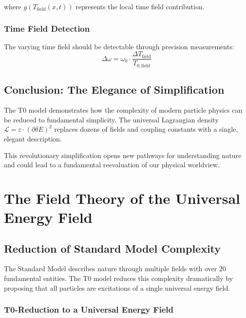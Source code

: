 \documentclass[12pt,a4paper]{report}
\begin{document}
	where $g(T_{\text{field}}(x,t))$ represents the local time field contribution.
	
	\subsection{Time Field Detection}
	
	The varying time field should be detectable through precision measurements:
	\begin{equation}
		\Delta\omega = \omega_0 \cdot \frac{\Delta T_{\text{field}}}{T_{0,\text{field}}}
	\end{equation}
	
	\section{Conclusion: The Elegance of Simplification}
	
	The T0 model demonstrates how the complexity of modern particle physics can be reduced to fundamental simplicity. The universal Lagrangian density $\mathcal{L} = \varepsilon \cdot (\partial\delta E)^2$ replaces dozens of fields and coupling constants with a single, elegant description.
	
	This revolutionary simplification opens new pathways for understanding nature and could lead to a fundamental reevaluation of our physical worldview.
	
	\chapter{The Field Theory of the Universal Energy Field}
	\label{chap:universal_field_theory}
	
	\section{Reduction of Standard Model Complexity}
	\label{sec:sm_complexity}
	
	The Standard Model describes nature through multiple fields with over 20 fundamental entities. The T0 model reduces this complexity dramatically by proposing that all particles are excitations of a single universal energy field.
	
	\subsection{T0-Reduction to a Universal Energy Field}
	\label{subsec:t0_reduction}
	
\end{document}
